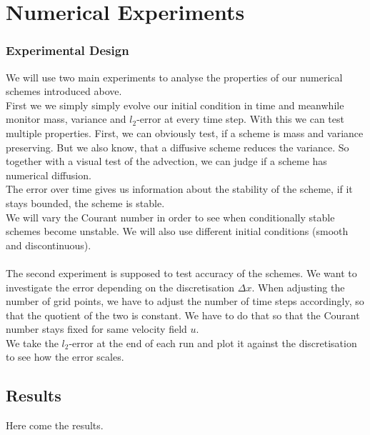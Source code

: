\section{Numerical Experiments}
\subsubsection{Experimental Design}
We will use two main experiments to analyse the properties of our numerical schemes introduced above. \\
First we we simply simply evolve our initial condition in time and meanwhile monitor mass, variance and $l_2$-error at every time step. 
With this we can test multiple properties. First, we can obviously test, if a scheme is mass and variance preserving. But we also know, that a diffusive scheme reduces the variance. So together with a visual test of the advection, we can judge if a scheme has numerical diffusion. \\
The error over time gives us information about the stability of the scheme, if it stays bounded, the scheme is stable. \\
We will vary the Courant number in order to see when conditionally stable schemes become unstable. We will also use different initial conditions (smooth and discontinuous).\\ \\
The second experiment is supposed to test accuracy of the schemes. We want to investigate the error depending on the discretisation $\Delta x$. When adjusting the number of grid points, we have to adjust the number of time steps accordingly, so that the quotient of the two is constant. We have to do that so that the  Courant number stays fixed for same velocity field $u$. \\
We take the $l_2$-error at the end of each run and plot it against the discretisation to see how the error scales.
\subsection{Results}
Here come the results.